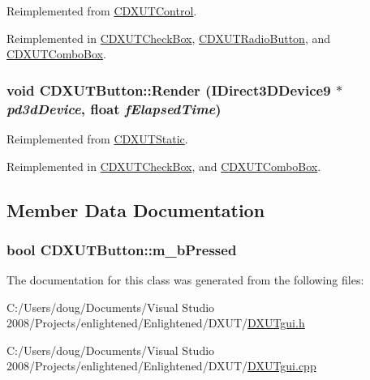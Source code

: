 Reimplemented from \hyperlink{class_c_d_x_u_t_control_a493169ad5b2877d6353eea95b697208e}{CDXUTControl}.

Reimplemented in \hyperlink{class_c_d_x_u_t_check_box_a5d9a74ce30be05f4867945c80f298a0a}{CDXUTCheckBox}, \hyperlink{class_c_d_x_u_t_radio_button_a2950447936727f33130fa4f6928045ac}{CDXUTRadioButton}, and \hyperlink{class_c_d_x_u_t_combo_box_a09eecfbd4d5173cf55c15c583b1a2209}{CDXUTComboBox}.\hypertarget{class_c_d_x_u_t_button_a75a837a8eca0777b51d3aac6de6d6144}{
\subsubsection[{Render}]{\setlength{\rightskip}{0pt plus 5cm}void CDXUTButton::Render (IDirect3DDevice9 $\ast$ {\em pd3dDevice}, \/  float {\em fElapsedTime})}}
\label{class_c_d_x_u_t_button_a75a837a8eca0777b51d3aac6de6d6144}


Reimplemented from \hyperlink{class_c_d_x_u_t_static_a7237fbf3accc077c35c2dd79b9bd2e3e}{CDXUTStatic}.

Reimplemented in \hyperlink{class_c_d_x_u_t_check_box_a518c5e4d5250b1c0be83bf456c43f8b8}{CDXUTCheckBox}, and \hyperlink{class_c_d_x_u_t_combo_box_affcd25fdf9baf53e39e7b50e58ee05d4}{CDXUTComboBox}.

\subsection{Member Data Documentation}
\hypertarget{class_c_d_x_u_t_button_ae60b08141abedf4b709e01ac6c8e6940}{
\subsubsection[{m\_\-bPressed}]{\setlength{\rightskip}{0pt plus 5cm}bool {\bf CDXUTButton::m\_\-bPressed}}}
\label{class_c_d_x_u_t_button_ae60b08141abedf4b709e01ac6c8e6940}


The documentation for this class was generated from the following files:\begin{DoxyCompactItemize}
\item 
C:/Users/doug/Documents/Visual Studio 2008/Projects/enlightened/Enlightened/DXUT/\hyperlink{_d_x_u_tgui_8h}{DXUTgui.h}\item 
C:/Users/doug/Documents/Visual Studio 2008/Projects/enlightened/Enlightened/DXUT/\hyperlink{_d_x_u_tgui_8cpp}{DXUTgui.cpp}\end{DoxyCompactItemize}
